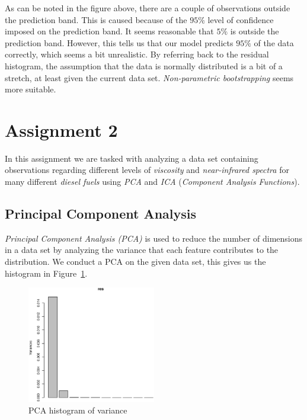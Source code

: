 \documentclass[a4paper, twocolumn]{article}
\begin{document}
        As can be noted in the figure above, there are a couple of observations outside the prediction band. This is caused because of the $95 \%$ level of confidence imposed on the prediction band. It seems reasonable that $5 \%$ is outside the prediction band. However, this tells us that our model predicts $95 \%$ of the data correctly, which seems a bit unrealistic. By referring back to the residual histogram, the assumption that the data is normally distributed is a bit of a stretch, at least given the current data set. \emph{Non-parametric bootstrapping} seems more suitable.


    \section*{Assignment 2}

        In this assignment we are tasked with analyzing a data set containing observations regarding different levels of \emph{viscosity} and \emph{near-infrared spectra} for many different \emph{diesel fuels} using \emph{PCA} and \emph{ICA} (\emph{Component Analysis Functions}).

    \subsection*{Principal Component Analysis}

        \emph{Principal Component Analysis (PCA)} is used to reduce the number of dimensions in a data set by analyzing the variance that each feature contributes to the distribution. We conduct a PCA on the given data set, this gives us the histogram in Figure~\ref{fig:pcahist}.

        \begin{figure}[h!]
            \centering
            \caption{PCA histogram of variance}
            \label{fig:pcahist}
            \includegraphics[width=0.5\textwidth]{share/A2_pcahist.eps}
        \end{figure}
\end{document}

